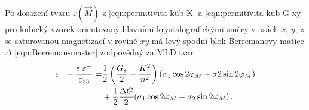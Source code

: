 Po dosazení tvaru $\varepsilon(\vec{M})$ z \eqref{eqn:permitivita-kub-K} a \eqref{eqn:permitivita-kub-G-xy} pro kubický vzorek orientovaný hlavními krystalografickými směry v osách $x$, $y$, $z$ se saturovanou magnetizací v rovině $xy$ má levý spodní blok Berremanovy matice $\Delta$ \eqref{eqn:Berreman-master} zodpovědný za MLD tvar
\begin{align}
    \varepsilon^\perp - \frac{\varepsilon^\vert\varepsilon^-}{\varepsilon_{33}} =& \frac{1}{2}\left( \frac{G_s}{2}-\frac{K^2}{n^2} \right) (\sigma_1\cos2\varphi_M + \sigma2\sin2\varphi_M) \\
                                                                                &+ \frac{1}{2}\frac{\Delta G}{2}(\sigma_1\cos2\varphi_M - \sigma_2 \sin2\varphi_M) \,.
\end{align}


